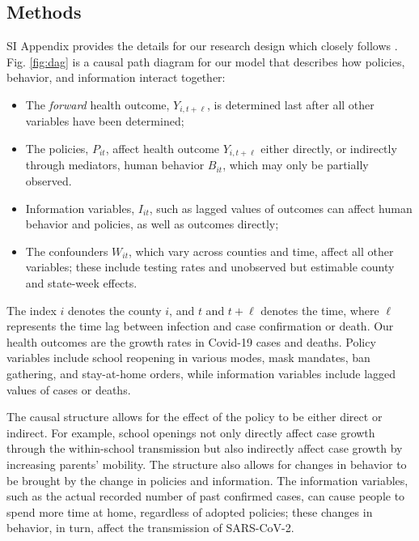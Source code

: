 \documentclass[9pt,twocolumn,twoside,lineno]{pnas-new}
\begin{document}
\subsection*{Methods} SI Appendix provides the details for  our research design which closely follows \cite{chernozhukov2021}.
Fig. \ref{fig:dag} is a causal path diagram \citep[see][]{pearl:causality,hunermund2021causal} for our model that describes how policies, behavior, and information interact together:
\begin{itemize}
\item The \textit{forward} health outcome,
$Y_{i,t+\ell}$, is determined last after all other variables have been determined;
\item The policies, $P_{it}$,  affect health outcome $Y_{i,t+\ell}$ either directly, or indirectly through mediators, human behavior $B_{it}$, which may only be partially observed. 
\item  Information variables, $I_{it}$, such as lagged values of outcomes can affect human behavior and policies, as well as  outcomes directly;
\item The confounders $W_{it}$, which vary across counties and time, affect all other variables; these include testing rates and
unobserved but estimable county and state-week effects.
\end{itemize}

The index $i$ denotes the county $i$, and $t$ and $t+\ell$ denotes the time, where $\ell$ represents the time lag between infection and case confirmation or death. Our health outcomes are the growth rates in Covid-19 cases and deaths. Policy variables include school reopening in various modes, mask mandates, ban gathering, and stay-at-home orders, while information variables include lagged values of cases or deaths.

The causal structure allows for the effect of the policy to be either direct or indirect. For example, school openings not only directly affect case growth through the within-school transmission but also indirectly affect case growth by increasing parents' mobility. The structure also allows for changes in behavior to be brought by the change in policies and information. The information variables, such as the actual recorded number of past  confirmed cases, can cause people to spend more time at home, regardless of adopted policies; these changes in behavior, in turn, affect the transmission of SARS-CoV-2.
\end{document}
